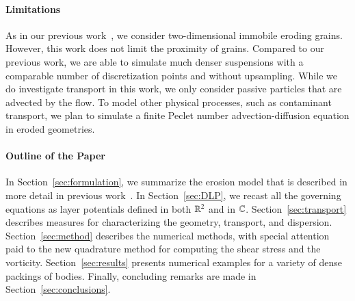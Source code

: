 \documentclass[preprint,10pt]{elsarticle}
\begin{document}
\paragraph{Limitations}
As in our previous work~\cite{qua-moo2018}, we consider two-dimensional
immobile eroding grains. However, this work does not limit the proximity
of  grains. Compared to our previous work, we are able to simulate much
denser suspensions with a comparable number of discretization points and
without upsampling.  While we do investigate transport in this work, we
only consider passive particles that are advected by the flow.  To model
other physical processes, such as contaminant transport, we plan to
simulate a finite Peclet number advection-diffusion equation in eroded
geometries.

\paragraph{Outline of the Paper}
In Section~\ref{sec:formulation}, we summarize the erosion model that is
described in more detail in previous work~\cite{qua-moo2018}.  In
Section~\ref{sec:DLP}, we recast all the governing equations as layer
potentials defined in both ${\mathbb{R}}^2$ and in ${\mathbb{C}}$.
Section~\ref{sec:transport} describes measures for characterizing the
geometry, transport, and dispersion. Section~\ref{sec:method} describes
the numerical methods, with special attention paid to the new quadrature
method for computing the shear stress and the vorticity.
Section~\ref{sec:results} presents numerical examples for a variety of
dense packings of bodies.  Finally, concluding remarks are made in
Section~\ref{sec:conclusions}.

\end{document}
